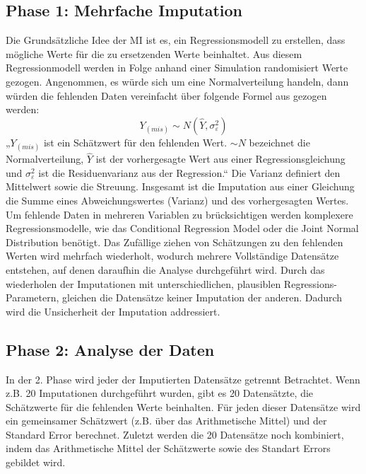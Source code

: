 \subsection{Phase 1: Mehrfache Imputation}

Die Grundsätzliche Idee der MI ist es, ein Regressionsmodell zu erstellen, dass mögliche Werte für die zu ersetzenden Werte 
beinhaltet. Aus diesem Regressionmodell werden in Folge anhand einer Simulation randomisiert Werte gezogen. Angenommen, es 
würde sich um eine Normalverteilung handeln, dann würden die fehlenden Daten vereinfacht über folgende Formel aus \textcite[8]{Enders2017} gezogen werden:
\begin{equation}
 Y_{(mis)}\sim N(\widehat{Y}, \sigma_\varepsilon^2)
\end{equation}
„$Y_{(mis)}$ ist ein Schätzwert für den fehlenden Wert. $\sim N$ bezeichnet die Normalverteilung, $\widehat{Y}$ ist der vorhergesagte Wert aus 
einer Regressionsgleichung und $\sigma_\varepsilon^2$ ist die Residuenvarianz aus der Regression.“ \autocite[8]{Enders2017}  Die Varianz definiert 
den Mittelwert sowie die Streuung. 
Insgesamt ist die Imputation aus einer Gleichung die Summe eines Abweichungswertes 
(Varianz) und des vorhergesagten Wertes. \autocite[8]{Enders2017} Um fehlende Daten in mehreren Variablen zu brücksichtigen 
werden komplexere Regressionsmodelle, wie das Conditional Regression Model oder die Joint Normal Distribution benötigt. 
Das Zufällige ziehen von Schätzungen zu den fehlenden Werten wird mehrfach wiederholt, wodurch mehrere Vollständige 
Datensätze entstehen, auf denen daraufhin die Analyse durchgeführt wird. \autocite[163 ff.]{Lee2014} Durch das 
wiederholen der Imputationen mit unterschiedlichen, plausiblen Regressions-Parametern, gleichen die Datensätze keiner 
Imputation der anderen. Dadurch wird die Unsicherheit der Imputation addressiert. \autocite[8]{Enders2017}

\subsection{Phase 2: Analyse der Daten}

In der 2. Phase wird jeder der Imputierten Datensätze getrennt Betrachtet. Wenn z.B. 20 Imputationen durchgeführt wurden, 
gibt es 20 Datensätzte, die Schätzwerte für die fehlenden Werte beinhalten. Für jeden dieser Datensätze wird ein gemeinsamer 
Schätzwert (z.B. über das Arithmetische Mittel) und der Standard Error berechnet. Zuletzt werden die 20 Datensätze noch 
kombiniert, indem das Arithmetische Mittel der Schätzwerte sowie des Standart Errors gebildet wird. \autocite[10]{Enders2017}

